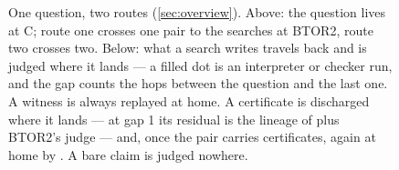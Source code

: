 \begin{figure}
{\begin{tikzpicture}
\end{tikzpicture}}
\caption{One question, two routes (\cref{sec:overview}). Above: the
question lives at C; route one crosses one pair to the searches at
BTOR2, route two crosses two. Below: what a search writes travels
back and is judged where it lands --- a filled dot is an interpreter
or checker run, and the gap counts the hops between the question and
the last one. A witness is always replayed at home. A certificate is
discharged where it lands --- at gap 1 its residual is the lineage of
 plus BTOR2's judge --- and, once the pair carries
certificates, again at home by . A bare claim is judged
nowhere.}
\label{fig:routes}
\end{figure}

